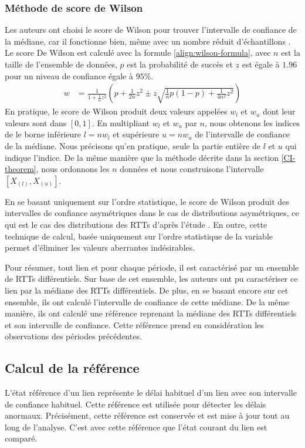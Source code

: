 \subsubsection{Méthode de score de  Wilson}
Les auteurs ont choisi le score de Wilson pour trouver l'intervalle de confiance de la médiane,  car il fonctionne bien, même avec un  nombre réduit d'échantillons \cite{doi:10.1002/sim.2164}. Le score De Wilson est calculé avec la formule \ref{align:wilson-formula}, avec  $n$ est la taille de l'ensemble de données, $p$ est la probabilité de succès et $z$ est égale à $1.96$ pour un niveau de confiance égale à $95\%$.
\begin{align}
w&= \frac{1}{1 + \frac{1}{n}z^2} \left( p + \frac{1}{2n} z^2 \pm z \sqrt{\frac{1}{n}p(1-p)+ \frac{1}{4n^2}z^2} \right)\label{align:wilson-formula}
\end{align} 
En pratique, le score de Wilson  produit deux valeurs appelées $w_l$ et $w_u$ dont leur valeurs sont dans $[0, 1]$. En multipliant $w_l$ et $w_u$ par $n$, nous obtenons les indices de le borne inférieure $l = nw_l$  et supérieure $u = nw_u$ de l'intervalle de confiance de la médiane. Nous précisons qu'en pratique, seule la partie entière de $l$ et $u$ qui indique l'indice. 
De la même manière que la méthode décrite dans la section \ref{CI-theorem}, nous ordonnons les $n$ données et nous construisons l'intervalle $[X_{(l)}, X_{(u)}]$.


En se basant uniquement sur l'ordre statistique, le score de Wilson produit des intervalles de confiance asymétriques dans le cas de distributions asymétriques, ce qui est le cas  des distributions des RTTs d'après l'étude \cite{DBLP:conf/infocom/FontugneMF15}. En outre, cette technique de calcul, basée uniquement sur l'ordre statistique de la variable permet d'éliminer les valeurs aberrantes indésirables.

Pour résumer, tout lien et pour chaque période, il est caractérisé par un ensemble de RTTs différentiels. Sur base de cet ensemble, les auteurs ont pu  caractériser ce lien par  la médiane  des RTTs différentiels.  De plus, en se basant encore sur cet ensemble, ils ont calculé l'intervalle de confiance de cette médiane. De la même manière, ils ont calculé une référence reprenant la médiane des RTTs différentiels et son intervalle de confiance. Cette référence prend en considération les observations des périodes précédentes.  



\subsection{Calcul de la référence} \label{reference-lissage}
L'état référence d'un lien représente le délai habituel d'un lien avec son intervalle de confiance habituel. Cette référence est utilisée pour détecter les délais anormaux. Précisément, cette référence est conservée  et  est mise à jour tout au long de l'analyse. C'est avec cette référence que l'état courant du lien est comparé. 

